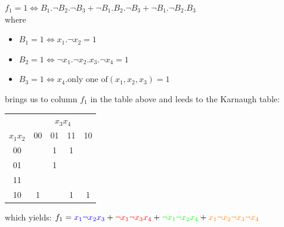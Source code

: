 \documentclass[10pt,a4paper]{scrartcl}
\newcommand{\subExercise}[1]{\vspace{0.5em} \noindent{\bf #1)}}
\begin{document}
\subExercise{a1}
$f_1 = 1 \Leftrightarrow B_1 . \neg B_2 . \neg B_3 + \neg B_1 . B_2 . \neg B_3 + \neg B_1 . \neg B_2 . B_3$ \\ where
\begin{itemize}
 \item $B_1 = 1 \Leftrightarrow x_1 . \neg x_2 = 1$
 \item $B_2 = 1 \Leftrightarrow \neg x_1 . \neg x_2 . x_3 . \neg x_4  = 1$
 \item $B_3 = 1 \Leftrightarrow x_4 . \text{only one of}(x_1,x_2,x_3) = 1$
\end{itemize}
brings us to column $f_1$ in the table above and leeds to the Karnaugh table:

\begin{tabular}{|c||c|c|c|c|}
  \hline
            & \multicolumn{4}{c|}{$x_3x_4$} \\
$x_1x_2$ & 00                  & 01                  & 11                 & 10                \\ \hline
    00   &                     & \cellcolor{yellow}1 & \cellcolor{green}1 &                   \\ \hline
    01   &                     & \cellcolor{red}1    &                    &                   \\ \hline
    11   &                     &                     &                    &                   \\ \hline
    10   & \cellcolor{orange}1 &                     & \cellcolor{blue}1  & \cellcolor{blue}1 \\
  \hline
\end{tabular}
which yields: $f_1 =  \textcolor{blue}{x_1\neg x_2x_3}+
                      \textcolor{red}{\neg x_1\neg x_3x_4}+
                      \textcolor{green}{\neg x_1\neg x_2x_4}+
                      \textcolor{orange}{x_1\neg x_2\neg x_3\neg x_4}$
\end{document}

